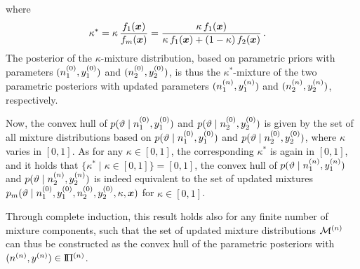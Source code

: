 where
\begin{align*}
\kappa^* &= \kappa\, \frac{f_1({\bm x})}{f_m({\bm x})}
          = \frac{\kappa\, f_1({\bm x})}{\kappa\, f_1({\bm x}) + (1-\kappa)\, f_2({\bm x})}\,. 
\end{align*}
The posterior of the $\kappa$-mixture distribution,
based on parametric priors with parameters $(n^{(0)}_1,y^{(0)}_1)$ and $(n^{(0)}_2,y^{(0)}_2)$,
is thus the $\kappa^*$-mixture of the two parametric posteriors
with updated parameters $(n^{(n)}_1,y^{(n)}_1)$ and $(n^{(n)}_2,y^{(n)}_2)$, respectively.

Now, the convex hull of $p(\vartheta\mid n^{(0)}_1,y^{(0)}_1)$ and $p(\vartheta\mid n^{(0)}_2,y^{(0)}_2)$
is given by the set of all mixture distributions based on $p(\vartheta\mid n^{(0)}_1,y^{(0)}_1)$ and $p(\vartheta\mid n^{(0)}_2,y^{(0)}_2)$,
where $\kappa$ varies in $[0, 1]$.
As for any $\kappa \in [0,1]$, the corresponding $\kappa^*$ is again in $[0,1]$,
and it holds that $\{\kappa^* \mid \kappa \in [0,1]\} = [0,1]$,
the convex hull of $p(\vartheta\mid n^{(n)}_1,y^{(n)}_1)$ and $p(\vartheta\mid n^{(n)}_2,y^{(n)}_2)$
is indeed equivalent to the set of updated mixtures $p_m(\vartheta\mid n^{(0)}_1,y^{(0)}_1, n^{(0)}_2,y^{(0)}_2, \kappa, {\bm x})$
for $\kappa \in [0,1]$.

Through complete induction, this result holds also for any finite number of mixture components, such that
the set of updated mixture distributions $\mathcal{M}^{(n)}$ can thus be constructed
as the convex hull of the parametric posteriors %
with $(n^{(n)},y^{(n)}) \in \text{I}\!\Pi^{(n)}$.

